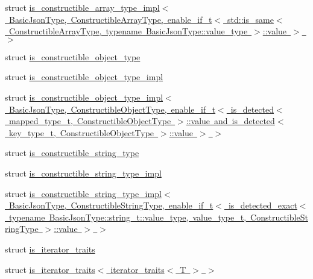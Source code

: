 \begin{DoxyCompactItemize}
\item 
struct \mbox{\hyperlink{structnlohmann_1_1detail_1_1is__constructible__array__type__impl_3_01_basic_json_type_00_01_cons8cf88e17d5eaa68665a8fb4b97604b0e}{is\+\_\+constructible\+\_\+array\+\_\+type\+\_\+impl$<$ Basic\+Json\+Type, Constructible\+Array\+Type, enable\+\_\+if\+\_\+t$<$ std\+::is\+\_\+same$<$ Constructible\+Array\+Type, typename Basic\+Json\+Type\+::value\+\_\+type $>$\+::value $>$ $>$}}
\item 
struct \mbox{\hyperlink{structnlohmann_1_1detail_1_1is__constructible__object__type}{is\+\_\+constructible\+\_\+object\+\_\+type}}
\item 
struct \mbox{\hyperlink{structnlohmann_1_1detail_1_1is__constructible__object__type__impl}{is\+\_\+constructible\+\_\+object\+\_\+type\+\_\+impl}}
\item 
struct \mbox{\hyperlink{structnlohmann_1_1detail_1_1is__constructible__object__type__impl_3_01_basic_json_type_00_01_con6e3270de8050717120afcafe87648413}{is\+\_\+constructible\+\_\+object\+\_\+type\+\_\+impl$<$ Basic\+Json\+Type, Constructible\+Object\+Type, enable\+\_\+if\+\_\+t$<$ is\+\_\+detected$<$ mapped\+\_\+type\+\_\+t, Constructible\+Object\+Type $>$\+::value and is\+\_\+detected$<$ key\+\_\+type\+\_\+t, Constructible\+Object\+Type $>$\+::value $>$ $>$}}
\item 
struct \mbox{\hyperlink{structnlohmann_1_1detail_1_1is__constructible__string__type}{is\+\_\+constructible\+\_\+string\+\_\+type}}
\item 
struct \mbox{\hyperlink{structnlohmann_1_1detail_1_1is__constructible__string__type__impl}{is\+\_\+constructible\+\_\+string\+\_\+type\+\_\+impl}}
\item 
struct \mbox{\hyperlink{structnlohmann_1_1detail_1_1is__constructible__string__type__impl_3_01_basic_json_type_00_01_con83e8ebfe9593f851a60fdb8360df1512}{is\+\_\+constructible\+\_\+string\+\_\+type\+\_\+impl$<$ Basic\+Json\+Type, Constructible\+String\+Type, enable\+\_\+if\+\_\+t$<$ is\+\_\+detected\+\_\+exact$<$ typename Basic\+Json\+Type\+::string\+\_\+t\+::value\+\_\+type, value\+\_\+type\+\_\+t, Constructible\+String\+Type $>$\+::value $>$ $>$}}
\item 
struct \mbox{\hyperlink{structnlohmann_1_1detail_1_1is__iterator__traits}{is\+\_\+iterator\+\_\+traits}}
\item 
struct \mbox{\hyperlink{structnlohmann_1_1detail_1_1is__iterator__traits_3_01iterator__traits_3_01_t_01_4_01_4}{is\+\_\+iterator\+\_\+traits$<$ iterator\+\_\+traits$<$ T $>$ $>$}}
\item 

\end{DoxyCompactItemize}
